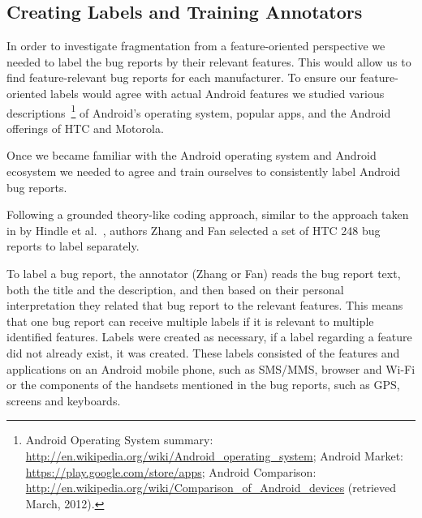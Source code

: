 \documentclass[10pt, conference, compsocconf]{IEEEtran}
\begin{document}
\subsection{Creating Labels and Training Annotators}


In order to investigate fragmentation from a feature-oriented
perspective we needed to label the bug reports by their
relevant features. This would allow us to find feature-relevant bug reports
for each manufacturer.
To ensure our feature-oriented labels would agree with actual
Android features we studied various descriptions~\footnote{Android Operating System summary:
\url{http://en.wikipedia.org/wiki/Android_operating_system};
Android Market: \url{https://play.google.com/store/apps};
Android Comparison:
\url{http://en.wikipedia.org/wiki/Comparison_of_Android_devices}
(retrieved March, 2012).}
 of Android's
operating system, popular apps, and the Android offerings of HTC and
Motorola.


Once we became familiar with the Android operating system and Android
ecosystem we needed to agree and train ourselves to consistently label
Android bug reports.


Following a grounded theory-like coding approach, similar to the
approach taken in by Hindle et al.~\cite{Hindle2011}, authors Zhang
and Fan selected a set of HTC 248 bug reports to label
separately. 

To label a bug report, the annotator (Zhang or Fan) reads the bug
report text, both the title and the description, and  then based on their
personal interpretation they related that bug report to the relevant
features. This means that one bug report can receive multiple labels
if it is relevant to multiple identified features. Labels were created
as necessary, if a label regarding a feature did not already exist, it
was created.
These labels 
consisted of the features and applications on an Android mobile
phone, such as SMS/MMS, browser and Wi-Fi or the components of the
handsets mentioned in the bug reports, such as GPS, screens and
keyboards.
\end{document}
